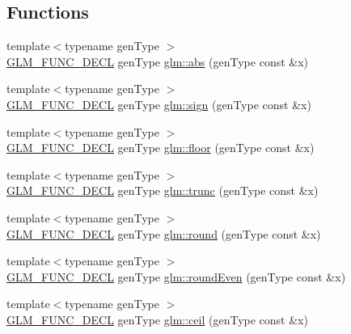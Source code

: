 \subsection*{Functions}
\begin{DoxyCompactItemize}
\item 
{\footnotesize template$<$typename gen\+Type $>$ }\\\hyperlink{setup_8hpp_ab2d052de21a70539923e9bcbf6e83a51}{G\+L\+M\+\_\+\+F\+U\+N\+C\+\_\+\+D\+E\+CL} gen\+Type \hyperlink{group__core__func__common_gaea946f96ec1df259802effe9f532e1c1}{glm\+::abs} (gen\+Type const \&x)
\item 
{\footnotesize template$<$typename gen\+Type $>$ }\\\hyperlink{setup_8hpp_ab2d052de21a70539923e9bcbf6e83a51}{G\+L\+M\+\_\+\+F\+U\+N\+C\+\_\+\+D\+E\+CL} gen\+Type \hyperlink{group__core__func__common_gaa7afd59ab947e313d41cb6d9c655a80c}{glm\+::sign} (gen\+Type const \&x)
\item 
{\footnotesize template$<$typename gen\+Type $>$ }\\\hyperlink{setup_8hpp_ab2d052de21a70539923e9bcbf6e83a51}{G\+L\+M\+\_\+\+F\+U\+N\+C\+\_\+\+D\+E\+CL} gen\+Type \hyperlink{group__core__func__common_ga86350252cc9bf86421317460bbd1f21c}{glm\+::floor} (gen\+Type const \&x)
\item 
{\footnotesize template$<$typename gen\+Type $>$ }\\\hyperlink{setup_8hpp_ab2d052de21a70539923e9bcbf6e83a51}{G\+L\+M\+\_\+\+F\+U\+N\+C\+\_\+\+D\+E\+CL} gen\+Type \hyperlink{group__core__func__common_gadb091aed51e45872f6dc841affa41c5c}{glm\+::trunc} (gen\+Type const \&x)
\item 
{\footnotesize template$<$typename gen\+Type $>$ }\\\hyperlink{setup_8hpp_ab2d052de21a70539923e9bcbf6e83a51}{G\+L\+M\+\_\+\+F\+U\+N\+C\+\_\+\+D\+E\+CL} gen\+Type \hyperlink{group__core__func__common_ga75ebab3fe88a9c5c769135cf5a2649ef}{glm\+::round} (gen\+Type const \&x)
\item 
{\footnotesize template$<$typename gen\+Type $>$ }\\\hyperlink{setup_8hpp_ab2d052de21a70539923e9bcbf6e83a51}{G\+L\+M\+\_\+\+F\+U\+N\+C\+\_\+\+D\+E\+CL} gen\+Type \hyperlink{group__core__func__common_ga6535952553479a4bbca7f1f12a011b17}{glm\+::round\+Even} (gen\+Type const \&x)
\item 
{\footnotesize template$<$typename gen\+Type $>$ }\\\hyperlink{setup_8hpp_ab2d052de21a70539923e9bcbf6e83a51}{G\+L\+M\+\_\+\+F\+U\+N\+C\+\_\+\+D\+E\+CL} gen\+Type \hyperlink{group__core__func__common_gab81e02fff55c9391e28fa47e68c3c903}{glm\+::ceil} (gen\+Type const \&x)

\end{DoxyCompactItemize}

